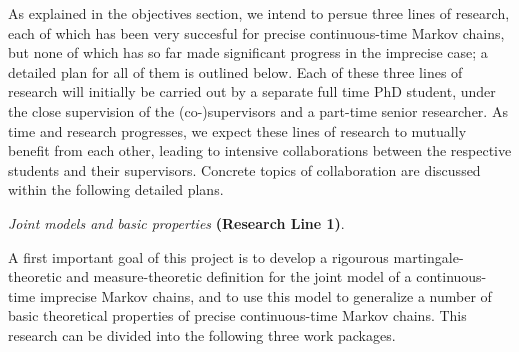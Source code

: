 \documentclass[11pt,dvipsnames,usenames,a4paper]{article}
\begin{document}
As explained in the objectives section, we intend to persue three lines of research, each of which has been very succesful for precise continuous-time Markov chains, but none of which has so far made significant progress in the imprecise case; a detailed plan for all of them is outlined below. Each of these three lines of research will initially be carried out by a separate full time PhD student, under the close supervision of the (co-)supervisors and a part-time senior researcher. As time and research progresses, we expect these lines of research to mutually benefit from each other, leading to intensive collaborations between the respective students and their supervisors. Concrete topics of collaboration are discussed within the following detailed plans.



\vspace{5pt}
\emph{Joint models and basic properties} {\bf (Research Line 1)}.
\vspace{3pt}

A first important goal of this project is to develop a rigourous martingale-theoretic and measure-theoretic definition for the joint model of a continuous-time imprecise Markov chains, and to use this model to generalize a number of basic theoretical properties of precise continuous-time Markov chains. %
This research can be divided into the following three work packages.
\end{document}
